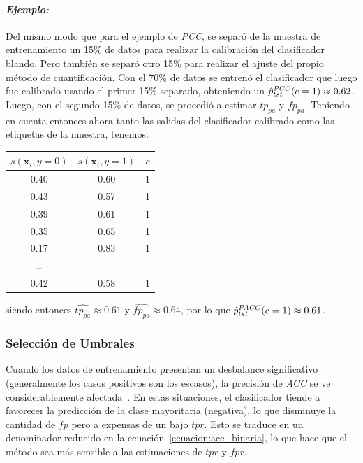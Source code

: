 \paragraph{\it Ejemplo:\/} Del mismo modo que para el ejemplo de {\it PCC}, se
separó de la muestra de entrenamiento un 15\% de datos para realizar la
calibración del clasificador blando. Pero también se separó otro 15\% para
realizar el ajuste del propio método de cuantificación. Con el 70\% de datos se
entrenó el clasificador que luego fue calibrado usando el primer 15\% separado,
obteniendo un $\hat p^{\it PCC\/}_{tst}(c=1) \approx 0.62$. Luego, con el
segundo 15\% de datos, se procedió a estimar $tp_{pa}$ y $fp_{pa}$. Teniendo en
cuenta entonces ahora tanto las salidas del clasificador calibrado como las
etiquetas de la muestra, tenemos:
\begin{center}
    \begin{tabular}{ccc}
        \toprule
        $s(\boldsymbol{x}_i, y=0)$ &  $s(\boldsymbol{x}_i, y=1)$ & $c$ \\
        \midrule
        0.40 &    0.60 &  1 \\
        0.43 &    0.57 &  1 \\
        0.39 &    0.61 &  1 \\
        0.35 &    0.65 &  1 \\
        0.17 &    0.83 &  1 \\
        \ldots              \\
        0.42 &    0.58 &  1 \\
     \bottomrule
        \bottomrule
        \end{tabular}
\end{center}

siendo entonces $\hat{tp_{pa}} \approx 0.61$ y $\hat{fp_{pa}} \approx 0.64$, por
lo que $\hat p^{\it PACC\/}_{tst}(c=1) \approx 0.61$.

\subsubsection{Selección de Umbrales}\label{puntual:umbrales}

Cuando los datos de entrenamiento presentan un desbalance significativo
(generalmente los casos positivos son los escasos), la precisión de {\it ACC\/}
se ve considerablemente afectada~\cite{forman2006quantifying}. En estas
situaciones, el clasificador tiende a favorecer la predicción de la clase
mayoritaria (negativa), lo que disminuye la cantidad de $fp$ pero a expensas de
un bajo $tpr$. Esto se traduce en un denominador reducido en la
ecuación~\ref{ecuacion:acc_binaria}, lo que hace que el método sea más sensible
a las estimaciones de $tpr$ y $fpr$.

